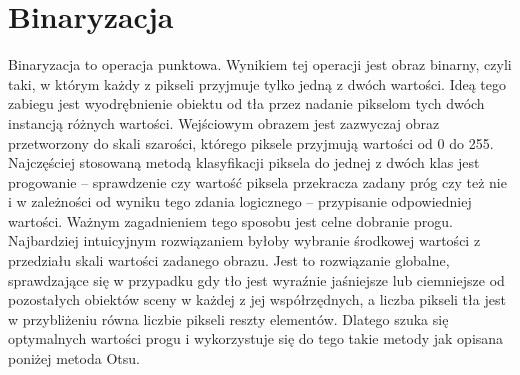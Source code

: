 \documentclass[eng,oneside]{mgr}
\begin{document}
\section{Binaryzacja}
\hspace{1cm} Binaryzacja to operacja punktowa. Wynikiem tej operacji jest obraz binarny, czyli taki, w którym każdy z pikseli przyjmuje tylko jedną z dwóch wartości. Ideą tego zabiegu jest wyodrębnienie obiektu od tła przez nadanie pikselom tych dwóch instancją różnych wartości. Wejściowym obrazem jest zazwyczaj obraz przetworzony do skali szarości, którego piksele przyjmują wartości od 0 do 255. Najczęściej stosowaną metodą klasyfikacji piksela do jednej z dwóch klas jest progowanie – sprawdzenie czy wartość piksela przekracza zadany próg czy też nie i w zależności od wyniku tego zdania logicznego – przypisanie odpowiedniej wartości. Ważnym zagadnieniem tego sposobu jest celne dobranie progu. Najbardziej intuicyjnym rozwiązaniem byłoby wybranie środkowej wartości z przedziału skali wartości zadanego obrazu. Jest to rozwiązanie globalne, sprawdzające się w przypadku gdy tło jest wyraźnie jaśniejsze lub ciemniejsze od pozostałych obiektów sceny w każdej z jej współrzędnych, a liczba pikseli tła jest w przybliżeniu równa liczbie pikseli reszty elementów. Dlatego szuka się optymalnych wartości progu i wykorzystuje się do tego takie metody jak opisana poniżej metoda Otsu.
\end{document}
